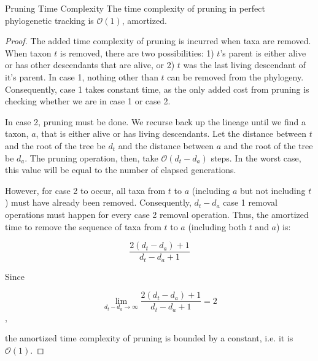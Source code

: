 \begin{theorem}{Pruning Time Complexity}
\label{thm:perfect-tracking-with-pruning-todo}
The time complexity of pruning in perfect phylogenetic tracking is $\mathcal{O}(1)$, amortized. 
\end{theorem}

\begin{proof}
\label{prf:perfect-tracking-with-pruning-todo}
The added time complexity of pruning is incurred when taxa are removed.
When taxon $t$ is removed, there are two possibilities: 1) $t$'s parent is either alive or has other descendants that are alive, or 2) $t$ was the last living descendant of it's parent.
In case 1, nothing other than $t$ can be removed from the phylogeny.
Consequently, case 1 takes constant time, as the only added cost from pruning is checking whether we are in case 1 or case 2.

In case 2, pruning must be done.
We recurse back up the lineage until we find a taxon, $a$, that is either alive or has living descendants. 
Let the distance between $t$ and the root of the tree be $d_t$ and the distance between $a$ and the root of the tree be $d_a$.
The pruning operation, then, take $\mathcal{O}(d_t - d_a)$ steps. 
In the worst case, this value will be equal to the number of elapsed generations.

However, for case 2 to occur, all taxa from $t$ to $a$ (including $a$ but not including $t$) must have already been removed.
Consequently, $d_t - d_a$ case 1 removal operations must happen for every case 2 removal operation.
Thus, the amortized time to remove the sequence of taxa from $t$ to $a$ (including both $t$ and $a$) is:

\[
\frac{2(d_t - d_a) + 1}{d_t - d_a + 1}
\]

Since

\[
\lim_{d_t - d_a\to\infty} \frac{2(d_t - d_a) + 1}{d_t - d_a + 1} = 2
\],

the amortized time complexity of pruning is bounded by a constant, i.e. it is $\mathcal{O}(1)$.


\end{proof}
